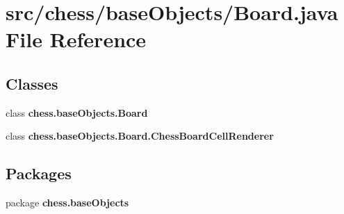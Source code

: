 \section{src/chess/base\+Objects/\+Board.java File Reference}
\label{_board_8java}
\subsection*{Classes}
\begin{DoxyCompactItemize}
\item 
class {\bf chess.\+base\+Objects.\+Board}
\item 
class {\bf chess.\+base\+Objects.\+Board.\+Chess\+Board\+Cell\+Renderer}
\end{DoxyCompactItemize}
\subsection*{Packages}
\begin{DoxyCompactItemize}
\item 
package {\bf chess.\+base\+Objects}
\end{DoxyCompactItemize}
